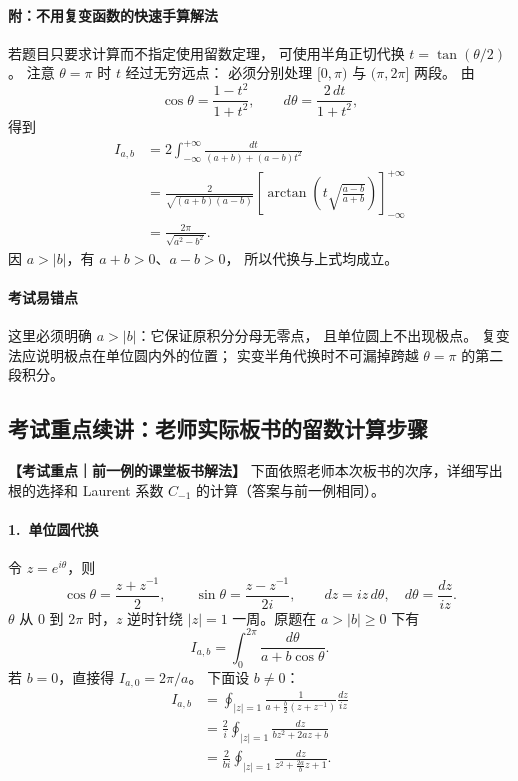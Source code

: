 \paragraph{附：不用复变函数的快速手算解法}
若题目只要求计算而不指定使用留数定理，
可使用半角正切代换 $t=\tan(\theta/2)$。
注意 $\theta=\pi$ 时 $t$ 经过无穷远点：
必须分别处理 $[0,\pi)$ 与 $(\pi,2\pi]$ 两段。
由
\[
  \cos\theta=\frac{1-t^2}{1+t^2},
  \qquad d\theta=\frac{2\,dt}{1+t^2},
\]
得到
\begin{align*}
  I_{a,b}
  &=2\int_{-\infty}^{+\infty}
       \frac{dt}{(a+b)+(a-b)t^2}\\
  &=\frac{2}{\sqrt{(a+b)(a-b)}}
       \left[
        \arctan\left(t\sqrt{\frac{a-b}{a+b}}\right)
       \right]_{-\infty}^{+\infty}\\
  &=\frac{2\pi}{\sqrt{a^2-b^2}}.
\end{align*}
因 $a>|b|$，有 $a+b>0$、$a-b>0$，
所以代换与上式均成立。

\paragraph{考试易错点}
这里必须明确 $a>|b|$：它保证原积分分母无零点，
且单位圆上不出现极点。
复变法应说明极点在单位圆内外的位置；
实变半角代换时不可漏掉跨越 $\theta=\pi$ 的第二段积分。


\subsection*{考试重点续讲：老师实际板书的留数计算步骤}
\noindent\textbf{【考试重点｜前一例的课堂板书解法】}
下面依照老师本次板书的次序，详细写出根的选择和 Laurent
系数 $C_{-1}$ 的计算（答案与前一例相同）。

\paragraph{1.\ 单位圆代换}
令 $z=e^{i\theta}$，则
\[
  \cos\theta=\frac{z+z^{-1}}2,\qquad
  \sin\theta=\frac{z-z^{-1}}{2i},
  \qquad dz=iz\,d\theta,\quad d\theta=\frac{dz}{iz}.
\]
$\theta$ 从 $0$ 到 $2\pi$ 时，$z$ 逆时针绕
$|z|=1$ 一周。原题在 $a>|b|\ge0$ 下有
\[
  I_{a,b}=\int_0^{2\pi}\frac{d\theta}{a+b\cos\theta}.
\]
若 $b=0$，直接得 $I_{a,0}=2\pi/a$。
下面设 $b\ne0$：
\begin{align*}
 I_{a,b}
 &=\oint_{|z|=1}
   \frac{1}{a+\frac b2(z+z^{-1})}\frac{dz}{iz}\\
 &=\frac2{i}\oint_{|z|=1}\frac{dz}{bz^2+2az+b}\\
 &=\frac{2}{bi}\oint_{|z|=1}
    \frac{dz}{z^2+\frac{2a}{b}z+1}.
\end{align*}

